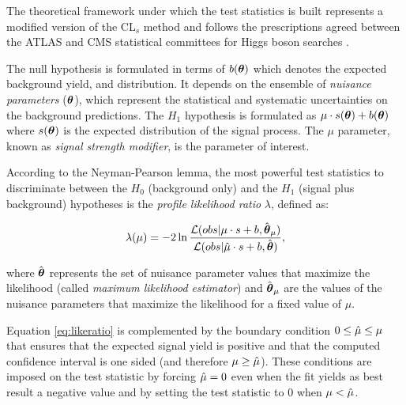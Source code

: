The theoretical framework under which the test statistics is built represents a modified version of the CL$_s$ method \cite{CLs} and follows the prescriptions agreed between the ATLAS and CMS statistical committees for Higgs boson searches \cite{higgscombo}.

The null hypothesis is formulated in terms of $b(\boldsymbol\theta)$ which denotes the expected background yield, and distribution. It depends on the ensemble of \emph{nuisance parameters} ($\boldsymbol\theta$), which represent the statistical and systematic uncertainties on the background predictions. %
The $H_1$ hypothesis is formulated as  $\mu \cdot s(\boldsymbol\theta) + b(\boldsymbol\theta)$ where $s(\boldsymbol\theta)$ is the expected distribution of the signal process. The $\mu$ parameter, known as \emph{signal strength modifier}, is the parameter of interest.


According to the Neyman-Pearson lemma, the most powerful test statistics to discriminate between the $H_0$ (background only) and the $H_1$ (signal plus background) hypotheses is the \emph{profile likelihood ratio} $\lambda$, defined as:

\begin{equation}
\label{eq:likeratio}
\lambda(\mu) = -2 \operatorname{ln} \dfrac{\mathcal{L}(obs | \mu \cdot s + b, \hat{\boldsymbol\theta}_\mu)}{\mathcal{L}(obs | \hat{\mu} \cdot s + b, \hat{\boldsymbol\theta})},
\end{equation}

where $\hat{\boldsymbol\theta}$ represents the set of nuisance parameter values that maximize the likelihood (called \emph{maximum likelihood estimator}) and $\hat{\boldsymbol\theta}_\mu$ are the values of the nuisance parameters that maximize the likelihood for a fixed value of $\mu$.

Equation \ref{eq:likeratio} is complemented by the boundary condition $0 \leq \hat{\mu} \leq \mu$ that ensures that the expected signal yield is positive and that the computed confidence interval is one sided (and therefore $\mu \geq \hat{\mu}$). These conditions are imposed on the test statistic by forcing $\hat{\mu} = 0$ even when the fit yields as best result a negative value and by setting the test statistic to 0 when $\mu < \hat{\mu}$.

